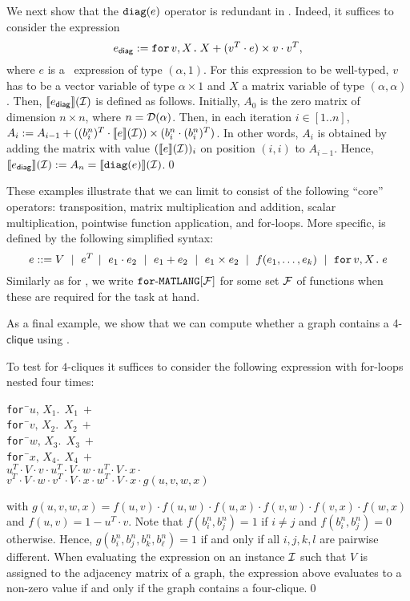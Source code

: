 \begin{example}\label{ex:diag}
We next show that the $\texttt{diag}(e)$ operator is redundant in \langfor.
Indeed, it suffices to consider the expression
$$e_{\mathsf{diag}}:=
\texttt{for}\, v,X \texttt{.}\, X + (v^T\cdot e) \times v\cdot v^T,$$ where $e$ is a \langfor\  expression of type $(\alpha,1)$. For this expression to be well-typed, $v$ has to be a vector variable of type $\alpha\times 1$ and $X$ a matrix variable of type $(\alpha,\alpha)$. Then, $\llbracket e_{\mathsf{diag}} \rrbracket(\mathcal{I})$ is defined as follows.
Initially, $A_0$ is the zero matrix of dimension $n\times n$, where $n=\mathcal{D}(\alpha)$. Then, in each iteration
$i\in[1..n]$, $A_{i}:=A_{i-1}+  ((b_i^n)^T\cdot\llbracket e \rrbracket(\mathcal{I}))\times (b_i^n\cdot (b_i^n)^T)$. In other words, $A_i$ is obtained by adding the matrix with value $(\llbracket e \rrbracket(\mathcal{I}))_i$ on position $(i,i)$ to $A_{i-1}$. Hence, $\llbracket e_{\mathsf{diag}} \rrbracket(\mathcal{I}):=A_n=\llbracket \texttt{diag}(e) \rrbracket(\mathcal{I})$.\qed
 \end{example}

These examples illustrate that we can limit \langfor to consist of the following ``core'' operators: transposition, matrix multiplication and addition, scalar multiplication, pointwise function application, and for-loops. More specific, \langfor is defined by the following simplified syntax:
$$
e ::= V \ \mid \ e^T \!\ \mid \ e_1 \cdot e_2 \ \mid \ e_1 + e_2 \ \mid \ e_1\times e_2  \ \mid \  f(e_1,\ldots ,e_k) \ \mid \ \texttt{for}\, v,X \texttt{.}\, e
$$
Similarly as for \lang, we write $\texttt{for}\text{-}\texttt{MATLANG}[\mathcal{F}]$ for some set $\mathcal{F}$ of functions when these are required for the task at hand.

As a final example, we show that we can compute whether a graph contains a 4-$\textsf{clique}$ using \langfor.
\begin{example}\label{ex:fourcliques}
To test for $4$-cliques it suffices to consider the following expression with for-loops nested four times:
\begin{center}
\parbox{0cm}{
\begin{tabbing}
\texttt{for\,}\=$u,\,X_1.\ \ X_1 \ + $\\
\> \texttt{for\,}\=$v,\,X_2.\ \ X_2 \ +$ \\
\>\>\texttt{for\,}\=$w,\,X_3.\ \ X_3 \ +$ \\
\>\>\>\texttt{for\,}\=$x,\,X_4.\ \ X_4 \ +$ \\
\>\>\>\>$u^T\cdot V\cdot v \cdot u^T\cdot V\cdot w\cdot u^T\cdot V\cdot x \cdot $\\
\>\>\>\>$v^T\cdot V\cdot w \cdot v^T\cdot V\cdot x\cdot w^T\cdot V\cdot x \cdot g(u,v,w,x)$
\end{tabbing}
}
\end{center}
with $g(u,v,w,x)=f(u,v)\cdot f(u,w)\cdot f(u,x)\cdot f(v,w)\cdot f(v,x)\cdot f(w,x)$ and
$f(u,v)=1-u^T\cdot v$. Note that $f(b_i^n,b_j^n)=1$ if $i\neq j$ and $f(b_i^n,b_j^n)=0$ otherwise.
Hence, $g(b_i^n,b_j^n,b_k^n,b_\ell^n)=1$ if and only if all $i,j,k,l$ are pairwise different.
When evaluating the expression on an instance $\mathcal{I}$ such that $V$ is assigned to the adjacency 
matrix of a graph, the expression above evaluates to a non-zero value if and only if the graph
contains a four-clique.\qed
\end{example}

